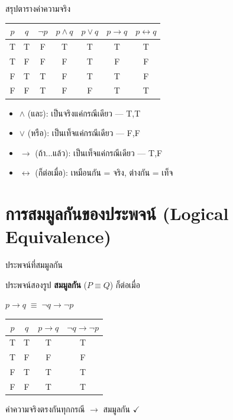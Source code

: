 \documentclass[11pt, aspectratio=169]{beamer}
\begin{document}
\begin{frame}{สรุปตารางค่าความจริง}
  \begin{center}
    \begin{tabular}{cc|c|c|c|c|c}
      $p$ & $q$ & $\lnot p$ & $p \land q$ & $p \lor q$ & $p \to q$ & $p \leftrightarrow q$ \\
      \hline
      T & T & F & T & T & T & T \\
      T & F & F & F & T & F & F \\
      F & T & T & F & T & T & F \\
      F & F & T & F & F & T & T
    \end{tabular}
  \end{center}

  \begin{intuition}[วิธีจำ]
    \begin{itemize}
      \item $\land$ (และ): เป็นจริงแค่กรณีเดียว — T,T
      \item $\lor$ (หรือ): เป็นเท็จแค่กรณีเดียว — F,F
      \item $\to$ (ถ้า...แล้ว): เป็นเท็จแค่กรณีเดียว — T,F
      \item $\leftrightarrow$ (ก็ต่อเมื่อ): เหมือนกัน = จริง, ต่างกัน = เท็จ
    \end{itemize}
  \end{intuition}
\end{frame}

\section{การสมมูลกันของประพจน์ (Logical Equivalence)}

\begin{frame}{ประพจน์ที่สมมูลกัน}
  \begin{explanation}[นิยาม]
    ประพจน์สองรูป \textbf{สมมูลกัน} ($P \equiv Q$) ก็ต่อเมื่อ
  \end{explanation}

  \begin{exambox}
    $p \to q \;\equiv\; \lnot q \to \lnot p$

    \medskip
    \begin{center}
      \begin{tabular}{cc|c|c}
        $p$ & $q$ & $p \to q$ & $\lnot q \to \lnot p$ \\
        \hline
        T & T & T & T \\
        T & F & F & F \\
        F & T & T & T \\
        F & F & T & T
      \end{tabular}
    \end{center}

    ค่าความจริงตรงกันทุกกรณี $\rightarrow$ สมมูลกัน $\checkmark$
  \end{exambox}
\end{frame}
\end{document}
